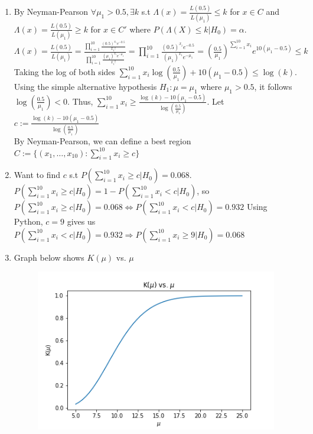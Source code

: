 \documentclass[10pt]{article}
\begin{document}
\begin{enumerate}[label=\textbf{Problem \arabic*.}]
\begin{enumerate}[label=\text{\arabic*.}]
        \item By Neyman-Pearson $\forall \mu_1>0.5, \exists k$ s.t $\Lambda(x)=\frac{L(0.5)}{L(\mu_1)}\le k$ for $x\in C$ and $\Lambda(x)=\frac{L(0.5)}{L(\mu_1)}\ge k$ for $x\in C'$ where $P(\Lambda(X)\le k|H_0)=\alpha$.\\
        $\Lambda(x)=\frac{L(0.5)}{L(\mu_1)}=\frac{\displaystyle\prod_{i=1}^{10}\frac{{(0.5)}^{x_i} e^{-0.5}}{x_i!}}{\displaystyle\prod_{i=1}^{10}\frac{{(\mu_1)}^{x_i}  e^{-\mu_1}}{x_i!}}=\displaystyle\prod_{i=1}^{10}\frac{{(0.5)}^{x_i} e^{-0.5}}{{(\mu_1)}^{x_i}  e^{-\mu_1}}={(\frac{0.5}{\mu_1})}^{\displaystyle\sum_{i=1}^{10}x_i}e^{10(\mu_1-0.5)}\le k$\\
        Taking the log of both sides $\displaystyle\sum_{i=1}^{10}x_i\log(\frac{0.5}{\mu_1})+10(\mu_1-0.5)\le \log(k)$.\\
        Using the simple alternative hypothesis $H_1:\mu=\mu_1$ where $\mu_1>0.5$, it follows $\log(\frac{0.5}{\mu_1})<0$.
        Thus, $\displaystyle\sum_{i=1}^{10}x_i\ge \frac{\log(k)-10(\mu_1-0.5)}{\log(\frac{0.5}{\mu_1})}$.
        Let $c:=\frac{\log(k)-10(\mu_1-0.5)}{\log(\frac{0.5}{\mu_1})}$\\
        By Neyman-Pearson, we can define a best region $C:=\{(x_1,\ldots,x_{10}):\displaystyle\sum_{i=1}^{10}x_i\ge c\}$
        \item Want to find $c$ s.t $P(\displaystyle\sum_{i=1}^{10}x_i\ge c|H_0)=0.068$. 
        $P(\displaystyle\sum_{i=1}^{10}x_i\ge c|H_0)=1-P(\sum_{i=1}^{10}x_i<c|H_0)$, so $P(\displaystyle\sum_{i=1}^{10}x_i\ge c|H_0)=0.068\Leftrightarrow P(\sum_{i=1}^{10}x_i<c|H_0)=0.932$
        Using Python, $c=9$ gives us $P(\sum_{i=1}^{10}x_i<c|H_0)=0.932\Rightarrow P(\sum_{i=1}^{10}x_i\ge 9|H_0)=0.068$
        \item Graph below shows $K(\mu)$ vs. $\mu$
        \begin{figure}[H]
            \centering
            \includegraphics[scale=0.4]{Math_170_S_hw_7_q_2.png}

\end{figure}
\end{enumerate}
\end{enumerate}
\end{document}
